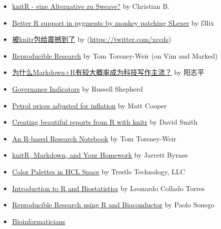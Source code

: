 \documentclass[
  xelatex,ja=standard,jafont=noto]{bxjsreport}
\begin{document}
\begin{itemize}
{  literate programming with R} by Christophe Lalanne
\item
  \href{http://www.blogofolio.de/2012/05/knitr-eine-alternative-zu-sweave/}{knitR
  - eine Alternative zu Sweave?} by Christian B.
\item
  \href{http://blog.felixriedel.com/2012/05/better-r-support-in-pygments-by-monkey-patching-slexer/}{Better
  R support in pygments by monkey patching SLexer} by f3lix
\item
  \href{http://xccds1977.blogspot.com/2012/05/knitr.html}{被knitr包给震撼到了}
  by \autocite{xccds}(\url{https://twitter.com/xccds})
\item
  \href{http://torsneyt.wordpress.com/2012/05/19/reproducible-research/}{Reproducible
  Research} by Tom Torsney-Weir (on Vim and Marked)
\item
  \href{http://www.yangzhiping.com/tech/r-markdown-knitr.html}{为什么Markdown+R有较大概率成为科技写作主流？}
  by 阳志平
\item
  \href{http://www.russellshepherd.com/d/?q=blog/governance-indicators}{Governance
  Indicators} by Russell Shepherd
\item
  \href{http://mcfromnz.wordpress.com/2012/07/28/petrol-prices-adjusted-for-inflation/}{Petrol
  prices adjusted for inflation} by Matt Cooper
\item
  \href{http://blog.revolutionanalytics.com/2012/08/creating-beautiful-reports-from-r-with-knitr.html}{Creating
  beautiful reports from R with knitr} by David Smith
\item
  \href{http://www.tomtorsneyweir.com/research-notebook/}{An R-based
  Research Notebook} by Tom Torsney-Weir
\item
  \href{http://learningdata.wordpress.com/2012/09/30/knitr-markdown-and-your-homework/}{knitR,
  Markdown, and Your Homework} by Jarrett Byrnes
\item
  \href{http://www.trestletechnology.net/2012/10/color-palettes-in-hcl-space/}{Color
  Palettes in HCL Space} by Trestle Technology, LLC
\item
  \href{http://fellgernon.tumblr.com/post/35587597245/introduction-to-r-and-biostatistics-2012-version}{Introduction
  to R and Biostatistics} by Leonardo Collado Torres
\item
  \href{http://onertipaday.blogspot.com/2012/12/italian-bio-r-day-2012-slides-on.html}{Reproducible
  Research using R and Bioconductor} by Paolo Sonego
\item
  \href{http://reasoniamhere.com/bioinformaticians-need-lab-notebooks-too/}{Bioinformaticians
}
\end{itemize}
\end{document}
